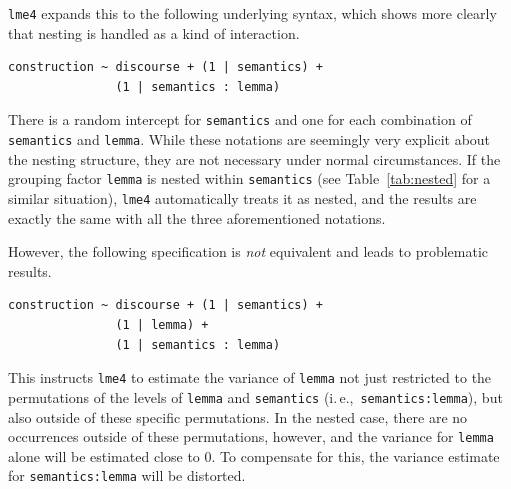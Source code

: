 \documentclass[a4paper,12pt]{article}
\newcommand{\ie}{i.\,e.,\ }
\begin{document}
\texttt{lme4} expands this to the following underlying syntax, which shows more clearly that nesting is handled as a kind of interaction.

\vspace{0.5\baselineskip}

\begin{lstlisting}
construction ~ discourse + (1 | semantics) +
               (1 | semantics : lemma)
\end{lstlisting}

There is a random intercept for \texttt{semantics} and one for each combination of \texttt{semantics} and \texttt{lemma}.
While these notations are seemingly very explicit about the nesting structure, they are not necessary under normal circumstances.
If the grouping factor \texttt{lemma} is nested within \texttt{semantics} (see Table~\ref{tab:nested} for a similar situation), \texttt{lme4} automatically treats it as nested, and the results are exactly the same with all the three aforementioned notations.

However, the following specification is \textit{not} equivalent and leads to problematic results.

\vspace{0.5\baselineskip}

\begin{lstlisting}
construction ~ discourse + (1 | semantics) +
               (1 | lemma) +
               (1 | semantics : lemma)
\end{lstlisting}

This instructs \texttt{lme4} to estimate the variance of \texttt{lemma} not just restricted to the permutations of the levels of \texttt{lemma} and \texttt{semantics} (\ie \texttt{semantics:lemma}), but also outside of these specific permutations.
In the nested case, there are no occurrences outside of these permutations, however, and the variance for \texttt{lemma} alone will be estimated close to $0$.
To compensate for this, the variance estimate for \texttt{semantics:lemma} will be distorted.
\end{document}
